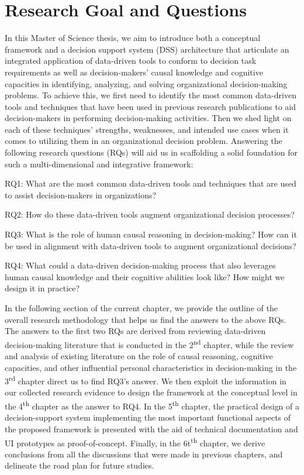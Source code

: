 \documentclass{sfuthesis}
\begin{document}
\section{Research Goal and Questions}
In this Master of Science thesis, we aim to introduce both a conceptual framework and a decision support system (DSS) architecture that articulate an integrated application of data-driven tools to conform to decision task requirements as well as decision-makers’ causal knowledge and cognitive capacities in identifying, analyzing, and solving organizational decision-making problems. To achieve this, we first need to identify the most common data-driven tools and techniques that have been used in previous research publications to aid decision-makers in performing decision-making activities. Then we shed light on each of these techniques’ strengths, weaknesses, and intended use cases when it comes to utilizing them in an organizational decision problem. Answering the following research questions (RQs) will aid us in scaffolding a solid foundation for such a multi-dimensional and integrative framework:\par
RQ1: What are the most common data-driven tools and techniques that are used to assist decision-makers in organizations?\par
RQ2: How do these data-driven tools augment organizational decision processes? \par
RQ3: What is the role of human causal reasoning in decision-making? How can it be used in alignment with data-driven tools to augment organizational decisions?\par
RQ4: What could a data-driven decision-making process that also leverages human causal knowledge and their cognitive abilities look like? How might we design it in practice?\par
In the following section of the current chapter, we provide the outline of the overall research methodology that helps us find the answers to the above RQs. The answers to the first two RQs are derived from reviewing data-driven decision-making literature that is conducted in the 2\textsuperscript{nd} chapter, while the review and analysis of existing literature on the role of causal reasoning, cognitive capacities, and other influential personal characteristics in decision-making in the 3\textsuperscript{rd} chapter direct us to find RQ3’s answer. We then exploit the information in our collected research evidence to design the framework at the conceptual level in the 4\textsuperscript{th} chapter as the answer to RQ4. In the 5\textsuperscript{th} chapter, the practical design of a decision-support system implementing the most important functional aspects of the proposed framework is presented with the aid of technical documentation and UI prototypes as proof-of-concept. Finally, in the 6t\textsuperscript{th} chapter, we derive conclusions from all the discussions that were made in previous chapters, and delineate the road plan for future studies.
\end{document}
